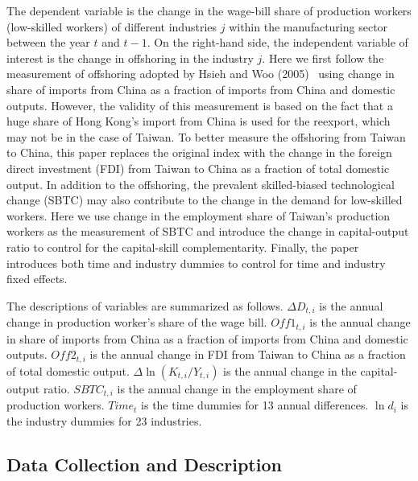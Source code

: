 \documentclass{article}
\begin{document}
The dependent variable is the change in the wage-bill share of production workers (low-skilled workers) of different industries $j$ within the manufacturing sector between the year $t$ and $t-1$. On the right-hand side, the independent variable of interest is the change in offshoring in the industry $j$. Here we first follow the measurement of offshoring adopted by Hsieh and Woo (2005)~\cite{hsieh2005impact} using change in share of imports from China as a fraction of imports from China and domestic outputs. However, the validity of this measurement is based on the fact that a huge share of Hong Kong’s import from China is used for the reexport, which may not be in the case of Taiwan. To better measure the offshoring from Taiwan to China, this paper replaces the original index with the change in the foreign direct investment (FDI) from Taiwan to China as a fraction of total domestic output. In addition to the offshoring, the prevalent skilled-biased technological change (SBTC) may also contribute to the change in the demand for low-skilled workers. Here we use change in the employment share of Taiwan’s production workers as the measurement of SBTC and introduce the change in capital-output ratio to control for the capital-skill complementarity. Finally, the paper introduces both time and industry dummies to control for time and industry fixed effects.\par

The descriptions of variables are summarized as follows. $\Delta D_{t,i}$ is the annual change in production worker's share of the wage bill. $Off1_{t,i}$ is the annual change in share of imports from China as a fraction of imports from China and domestic outputs. $Off2_{t,i}$ is the annual change in FDI from Taiwan to China as a fraction of total domestic output. $\Delta \ln (K_{t,i}/Y_{t,i})$ is the annual change in the capital-output ratio. $SBTC_{t,i}$ is the annual change in the employment share of production workers. $Time_t$ is the time dummies for 13 annual differences. $\ln d_i$ is the industry dummies for 23 industries.\par

\subsection{Data Collection and Description}
\end{document}
